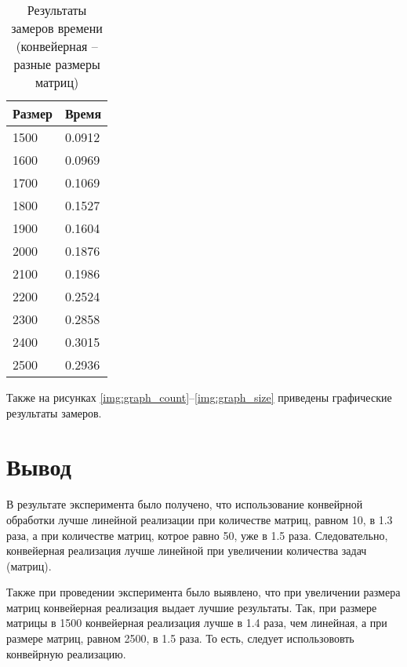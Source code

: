 \begin{table}[h]
    \begin{center}
        \begin{threeparttable}
        \captionsetup{justification=raggedright,singlelinecheck=off}
        \caption{Результаты замеров времени (конвейерная -- разные размеры матриц)}
        \label{tbl:time_conv_size}
        \begin{tabular}{|p{6cm}|p{6cm}|}
            \hline
            Размер & Время \\
            \hline 
            1500 & 0.0912 \\ \hline 
            1600 & 0.0969 \\ \hline 
            1700 & 0.1069 \\ \hline 
            1800 & 0.1527 \\ \hline 
            1900 & 0.1604 \\ \hline 
            2000 & 0.1876 \\ \hline 
            2100 & 0.1986 \\ \hline 
            2200 & 0.2524 \\ \hline 
            2300 & 0.2858 \\ \hline 
            2400 & 0.3015 \\ \hline 
            2500 & 0.2936 \\ \hline 
		\end{tabular}
    \end{threeparttable}
\end{center}
\end{table}

\clearpage

Также на рисунках \ref{img:graph_count}--\ref{img:graph_size} приведены графические результаты замеров.


\clearpage


\section{Вывод}

В результате эксперимента было получено, что использование конвейрной обработки лучше линейной реализации при количестве матриц, равном 10, в 1.3 раза, а при количестве матриц, котрое равно 50, уже в 1.5 раза. Следовательно, конвейерная реализация лучше линейной при увеличении количества задач (матриц).

Также при проведении эксперимента было выявлено, что при увеличении размера матриц конвейерная реализация выдает лучшие результаты. Так, при размере матрицы в 1500 конвейерная реализация лучше в 1.4 раза, чем линейная, а при размере матриц, равном 2500, в 1.5 раза. То есть, следует использововть конвейрную реализацию.